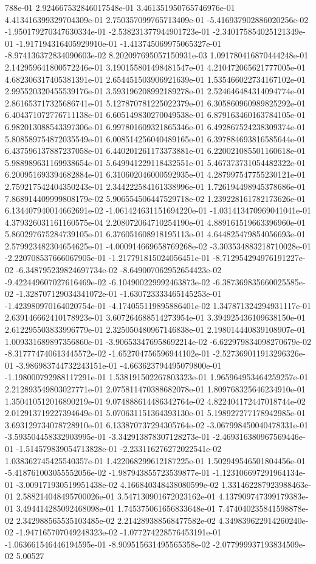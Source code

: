 788e-01	2.924667532846017548e-01	3.461351950765746976e-01	4.413416399329704309e-01	2.750357099765713409e-01	-5.416937902886020256e-02	-1.950179270347630334e-01	-2.538231377944901723e-01	-2.340175854025121349e-01	-1.917194316405929910e-01	-1.413745069975065327e-01	-8.974136372834090603e-02	8.202097695057150931e-03	1.091780416870444248e-01	2.142959641800572246e-01	3.190155801498481547e-01	4.210472065621777005e-01	4.682306317405381391e-01	2.654451503906921639e-01	1.535466022734167102e-01	2.995520320455539176e-01	3.593196208992189278e-01	2.524646484314094774e-01	2.861653717325686741e-01	5.127870781225022379e-01	6.305860960989825292e-01	6.404371072776711138e-01	6.605149830270049538e-01	6.879163460163784105e-01	6.982013088543397306e-01	6.997801609321865346e-01	6.492867524238309374e-01	5.808589754872035549e-01	6.008514256040489165e-01	6.397884693816585644e-01	6.437596137887237058e-01	6.440201261173373881e-01	6.220021085501160618e-01	5.988989631169938654e-01	5.649941229118432551e-01	5.467373731054482322e-01	6.200951693394682884e-01	6.310602046000592935e-01	4.287997547755230121e-01	2.759217542404350243e-01	2.344222584161338996e-01	1.726194498945378686e-01	7.868914409999808179e-02	5.906554506447529718e-02	1.239228161782173626e-01	6.134407940014662691e-02	-1.061424631151694220e-01	-1.031413470969041041e-01	4.379326031161160575e-04	2.208072064710254190e-01	4.889161519663396960e-01	5.860297675284739105e-01	6.376051608918195113e-01	4.644825479854056693e-01	2.579923482304654625e-01	-4.000914669658769268e-02	-3.303534883218710028e-01	-2.220708537666067905e-01	-1.217791815024056451e-01	-8.712954294976191227e-02	-6.348795239824697734e-02	-8.649007062952654423e-02	-9.422449607027616469e-02	-6.104900229992463873e-02	-6.387369835660025585e-02	-1.328707129034341072e-01	-1.630723333465145253e-01	-1.423980970164020754e-01	-4.174055119895886401e-02	1.347871324294931117e-01	2.639146662410178923e-01	3.607264688514273954e-01	3.394925436109638150e-01	2.612295503833996779e-01	2.325050480967146838e-01	2.198014440839108907e-01	1.009331689897356860e-01	-3.906533476958692214e-02	-6.622979834098270679e-02	-8.317774740613445572e-02	-1.652704756596944102e-01	-2.527369011913296326e-01	-3.986983744732243151e-01	-4.663623794495079800e-01	-1.198000792988117291e-01	1.538191502267803323e-01	1.965964953464259257e-01	2.212893549803027771e-01	2.075811470388682078e-01	1.809768325646234910e-01	1.350410512016890219e-01	9.074888614486342764e-02	4.822404172447018744e-02	2.012913719227394649e-01	5.070631151364393130e-01	5.198927277178942985e-01	3.693129734078728910e-01	6.133870737294305764e-02	-3.067998450040478331e-01	-3.593504458332903995e-01	-3.342913878307128273e-01	-2.469316380967569446e-01	-1.514579839054713828e-01	-2.233116276272022541e-02	1.038362745425540357e-01	1.422068299612187225e-01	1.502949546501804456e-01	-5.418761003055552056e-02	-1.987943855723539877e-01	-1.123106697291964134e-01	-3.009171930519951438e-02	4.166840348438080599e-02	1.331462287923988463e-01	2.588214048495700026e-01	3.547130901672023162e-01	4.137909747399179383e-01	3.494414285092468098e-01	1.745375061656833648e-01	7.474040235841598878e-02	2.342988565535103485e-02	2.214289388568477582e-02	4.349839622914260240e-02	-1.947165707049248323e-02	-1.077274228576453191e-01	-1.063661546446194595e-01	-8.909515631495565358e-02	-2.077999937193834509e-02	5.00527